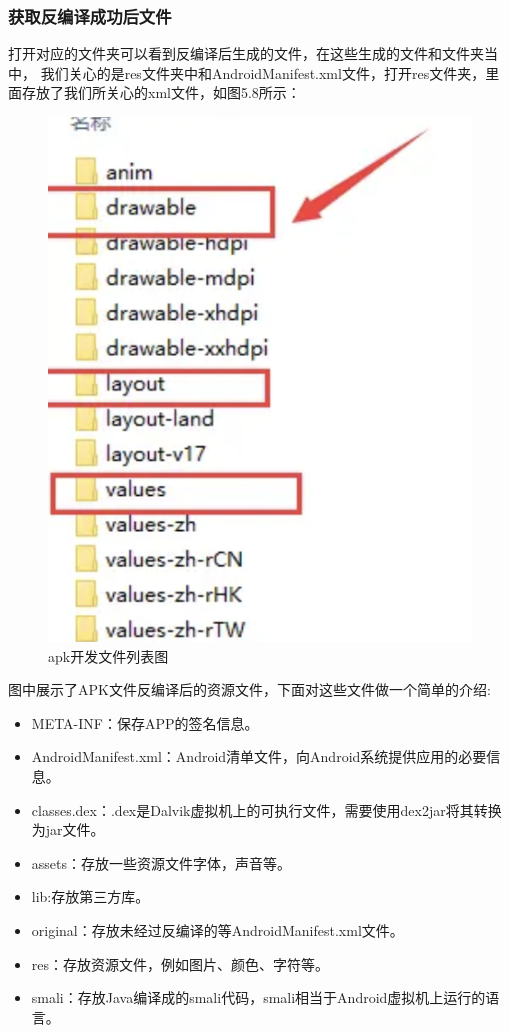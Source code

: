   \subsubsection{获取反编译成功后文件}
  打开对应的文件夹可以看到反编译后生成的文件，在这些生成的文件和文件夹当中，
  我们关心的是res文件夹中和AndroidManifest.xml文件，打开res文件夹，里面存放了我们所关心的xml文件，如图5.8所示：
  \begin{figure}
    \centering
    \includegraphics[scale=0.5]{resources/img/i20.png}
    \caption{apk开发文件列表图}
  \end{figure}
  图中展示了APK文件反编译后的资源文件，下面对这些文件做一个简单的介绍:
  \begin{itemize}
    \item META-INF：保存APP的签名信息。
    \item AndroidManifest.xml：Android清单文件，向Android系统提供应用的必要信息。
    \item classes.dex：.dex是Dalvik虚拟机上的可执行文件，需要使用dex2jar将其转换为jar文件。
    \item assets：存放一些资源文件字体，声音等。
    \item lib:存放第三方库。
    \item original：存放未经过反编译的等AndroidManifest.xml文件。
    \item res：存放资源文件，例如图片、颜色、字符等。
    \item smali：存放Java编译成的smali代码，smali相当于Android虚拟机上运行的语言。
\end{itemize}

